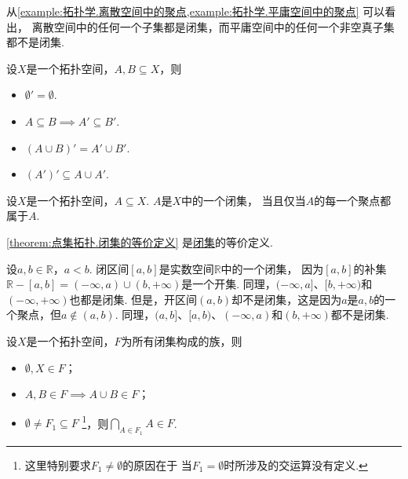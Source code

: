 \begin{remark}
从\cref{example:拓扑学.离散空间中的聚点,example:拓扑学.平庸空间中的聚点} 可以看出，
离散空间中的任何一个子集都是闭集，而平庸空间中的任何一个非空真子集都不是闭集.
\end{remark}

\begin{theorem}
设\(X\)是一个拓扑空间，\(A,B \subseteq X\)，则
\begin{itemize}
	\item \(\emptyset' = \emptyset\).
	\item \(A \subseteq B \implies A' \subseteq B'\).
	\item \((A \cup B)' = A' \cup B'\).
	\item \((A')' \subseteq A \cup A'\).
\end{itemize}
\end{theorem}

\begin{theorem}\label{theorem:点集拓扑.闭集的等价定义}
设\(X\)是一个拓扑空间，\(A \subseteq X\).
\(A\)是\(X\)中的一个闭集，
当且仅当\(A\)的每一个聚点都属于\(A\).
\end{theorem}
\cref{theorem:点集拓扑.闭集的等价定义} 是\hyperref[definition:拓扑空间.闭集的定义]{闭集}的等价定义.

\begin{example}
设\(a,b\in\mathbb{R}\)，\(a<b\).
闭区间\([a,b]\)是实数空间\(\mathbb{R}\)中的一个闭集，
因为\([a,b]\)的补集\(\mathbb{R}-[a,b]
=(-\infty,a)\cup(b,+\infty)\)是一个开集.
同理，\((-\infty,a]\)、\([b,+\infty)\)和\((-\infty,+\infty)\)也都是闭集.
但是，开区间\((a,b)\)却不是闭集，这是因为\(a\)是\(a,b\)的一个聚点，但\(a\notin(a,b)\).
同理，\((a,b]\)、\([a,b)\)、\((-\infty,a)\)和\((b,+\infty)\)都不是闭集.
\end{example}

\begin{theorem}\label{theorem:拓扑学.闭集族的性质}
设\(X\)是一个拓扑空间，\(F\)为所有闭集构成的族，则
\begin{itemize}
	\item \(\emptyset,X \in F\)；
	\item \(A,B \in F \implies A \cup B \in F\)；
	\item \(\emptyset \neq F_1 \subseteq F\)
	\footnote{%
		这里特别要求\(F_1 \neq \emptyset\)的原因在于
		当\(F_1 = \emptyset\)时所涉及的交运算没有定义.
	}，则\(\bigcap_{A \in F_1} A \in F\).
\end{itemize}
\end{theorem}

